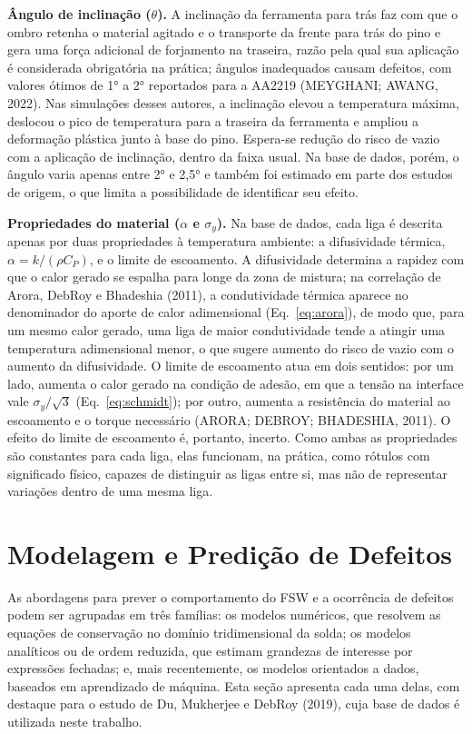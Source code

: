 \documentclass[12pt,openany]{report}
\begin{document}
\textbf{Ângulo de inclinação ($\theta$).} A inclinação da ferramenta para trás faz com que o ombro retenha o material agitado e o transporte da frente para trás do pino e gera uma força adicional de forjamento na traseira, razão pela qual sua aplicação é considerada obrigatória na prática; ângulos inadequados causam defeitos, com valores ótimos de 1° a 2° reportados para a AA2219 (MEYGHANI; AWANG, 2022). Nas simulações desses autores, a inclinação elevou a temperatura máxima, deslocou o pico de temperatura para a traseira da ferramenta e ampliou a deformação plástica junto à base do pino. Espera-se redução do risco de vazio com a aplicação de inclinação, dentro da faixa usual. Na base de dados, porém, o ângulo varia apenas entre 2° e 2,5° e também foi estimado em parte dos estudos de origem, o que limita a possibilidade de identificar seu efeito.

\textbf{Propriedades do material ($\alpha$ e $\sigma_y$).} Na base de dados, cada liga é descrita apenas por duas propriedades à temperatura ambiente: a difusividade térmica, $\alpha = k/(\rho C_P)$, e o limite de escoamento. A difusividade determina a rapidez com que o calor gerado se espalha para longe da zona de mistura; na correlação de Arora, DebRoy e Bhadeshia (2011), a condutividade térmica aparece no denominador do aporte de calor adimensional (Eq.~\ref{eq:arora}), de modo que, para um mesmo calor gerado, uma liga de maior condutividade tende a atingir uma temperatura adimensional menor, o que sugere aumento do risco de vazio com o aumento da difusividade. O limite de escoamento atua em dois sentidos: por um lado, aumenta o calor gerado na condição de adesão, em que a tensão na interface vale $\sigma_y/\sqrt{3}$ (Eq.~\ref{eq:schmidt}); por outro, aumenta a resistência do material ao escoamento e o torque necessário (ARORA; DEBROY; BHADESHIA, 2011). O efeito do limite de escoamento é, portanto, incerto. Como ambas as propriedades são constantes para cada liga, elas funcionam, na prática, como rótulos com significado físico, capazes de distinguir as ligas entre si, mas não de representar variações dentro de uma mesma liga.

\section{Modelagem e Predição de Defeitos}
\label{sec:modelagem}

As abordagens para prever o comportamento do FSW e a ocorrência de defeitos podem ser agrupadas em três famílias: os modelos numéricos, que resolvem as equações de conservação no domínio tridimensional da solda; os modelos analíticos ou de ordem reduzida, que estimam grandezas de interesse por expressões fechadas; e, mais recentemente, os modelos orientados a dados, baseados em aprendizado de máquina. Esta seção apresenta cada uma delas, com destaque para o estudo de Du, Mukherjee e DebRoy (2019), cuja base de dados é utilizada neste trabalho.
\end{document}
